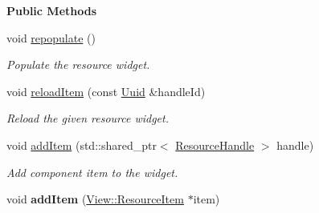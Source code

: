 \begin{Indent}\textbf{ Public Methods}\par
\begin{DoxyCompactItemize}
\item 
\mbox{\label{classrev_1_1_view_1_1_resource_tree_widget_a8adc0512c3890f451f4445486049ad89}} 
void \mbox{\hyperlink{classrev_1_1_view_1_1_resource_tree_widget_a8adc0512c3890f451f4445486049ad89}{repopulate}} ()
\begin{DoxyCompactList}\small\item\em Populate the resource widget. \end{DoxyCompactList}\item 
\mbox{\label{classrev_1_1_view_1_1_resource_tree_widget_a9be40bd5cc5f664fa8a5deb9d9011301}} 
void \mbox{\hyperlink{classrev_1_1_view_1_1_resource_tree_widget_a9be40bd5cc5f664fa8a5deb9d9011301}{reload\+Item}} (const \mbox{\hyperlink{classrev_1_1_uuid}{Uuid}} \&handle\+Id)
\begin{DoxyCompactList}\small\item\em Reload the given resource widget. \end{DoxyCompactList}\item 
\mbox{\label{classrev_1_1_view_1_1_resource_tree_widget_a9247d4b0d7141b7656ea8329690b9dec}} 
void \mbox{\hyperlink{classrev_1_1_view_1_1_resource_tree_widget_a9247d4b0d7141b7656ea8329690b9dec}{add\+Item}} (std\+::shared\+\_\+ptr$<$ \mbox{\hyperlink{classrev_1_1_resource_handle}{Resource\+Handle}} $>$ handle)
\begin{DoxyCompactList}\small\item\em Add component item to the widget. \end{DoxyCompactList}\item 
\mbox{\label{classrev_1_1_view_1_1_resource_tree_widget_ac20525161f482cb38b024a7be8fd3fdf}} 
void {\bfseries add\+Item} (\mbox{\hyperlink{classrev_1_1_view_1_1_resource_item}{View\+::\+Resource\+Item}} $\ast$item)
\item 
\mbox{\label{classrev_1_1_view_1_1_resource_tree_widget_a8e2d79e22e92526fb7e25e2d75547b61}} 

\end{DoxyCompactItemize}
\end{Indent}
